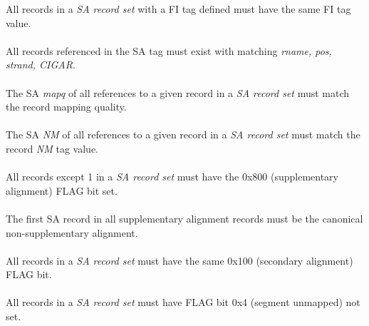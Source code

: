 \documentclass[10pt]{article}
\begin{document}
All records in a \textit{SA record set} with a FI tag defined must have the same FI tag value.

\paragraph{}

All records referenced in the SA tag must exist with matching \textit{rname, pos, strand, CIGAR}.

\paragraph{}

The SA \textit{mapq} of all references to a given record in a \textit{SA record set} must
match the record mapping quality.

\paragraph{}

The SA \textit{NM} of all references to a given record in a \textit{SA record set} must
match the record \textit{NM} tag value.

\paragraph{}

All records except 1 in a \textit{SA record set} must have the 0x800 (supplementary alignment) FLAG bit set.

\paragraph{}

The first SA record in all supplementary alignment records must be the canonical non-supplementary alignment.

\paragraph{}

All records in a \textit{SA record set} must have the same 0x100 (secondary alignment) FLAG bit.

\paragraph{}

All records in a \textit{SA record set} must have FLAG bit 0x4 (segment unmapped) not set.
\end{document}
